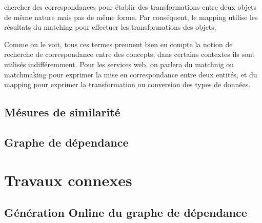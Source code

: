   \begin{mydef}[Mapping]
    chercher des correspondances pour établir des transformations
    entre deux objets de même nature mais pas de même forme. Par
    conséquent, le mapping utilise les résultats du matching pour
    effectuer les transformations des objets.
  \end{mydef}

  Comme on le voit, tous ces termes prennent bien en compte la notion
  de recherche de correspondance entre des concepts, dans certains
  contextes ils sont utilisés indifféremment.  Pour les services web,
  on parlera du matchnig ou matchmaking pour exprimer la mise en
  correspondance entre deux entités, et du mapping pour exprimer la
  transformation ou conversion des types de données.

  \subsection{Mésures de similarité}
  \label{sec:mesure-de-similarire}

  \subsection{Graphe de dépendance}
  \label{sec:graph-de-depandence}
  \cite{Omer2011}
\section{Travaux connexes}
\label{sec:travaux-relatives}


  \subsection{Génération Online du graphe de dépendance}
  \label{sec:generation-online-du}

